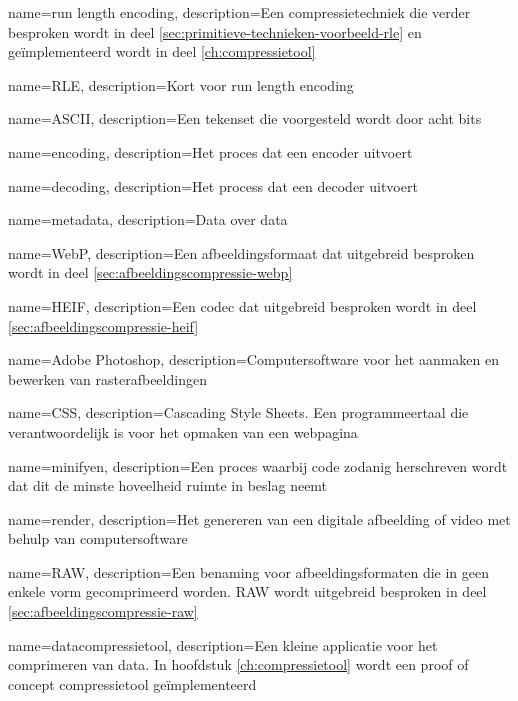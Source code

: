 {
	name={run length encoding},
	description={Een compressietechniek die verder besproken wordt in deel \ref{sec:primitieve-technieken-voorbeeld-rle} en geïmplementeerd wordt in deel \ref{ch:compressietool}}
}

{
	name={RLE},
	description={Kort voor run length encoding}
}

{
	name={ASCII},
	description={Een tekenset die voorgesteld wordt door acht bits}
}

{
	name={encoding},
	description={Het proces dat een encoder uitvoert}
}

{
	name={decoding},
	description={Het process dat een decoder uitvoert}
}

{
	name={metadata},
	description={Data over data}
}

{
	name={WebP},
	description={Een afbeeldingsformaat dat uitgebreid besproken wordt in deel \ref{sec:afbeeldingscompressie-webp}}
}

{
	name={HEIF},
	description={Een codec dat uitgebreid besproken wordt in deel \ref{sec:afbeeldingscompressie-heif}}
}

{
	name={Adobe Photoshop},
	description={Computersoftware voor het aanmaken en bewerken van rasterafbeeldingen}
}

\newglossaryentry{

}
{
	name={CSS},
	description={Cascading Style Sheets. Een programmeertaal die verantwoordelijk is voor het opmaken van een webpagina}
}

{
	name={minifyen},
	description={Een proces waarbij code zodanig herschreven wordt dat dit de minste hoveelheid ruimte in beslag neemt}
}

{
	name={render},
	description={Het genereren van een digitale afbeelding of video met behulp van computersoftware}
}

{
	name={RAW},
	description={Een benaming voor afbeeldingsformaten die in geen enkele vorm gecomprimeerd worden. RAW wordt uitgebreid besproken in deel \ref{sec:afbeeldingscompressie-raw}}
}

{
	name={datacompressietool},
	description={Een kleine applicatie voor het comprimeren van data. In hoofdstuk \ref{ch:compressietool} wordt een proof of concept compressietool geïmplementeerd}
}

